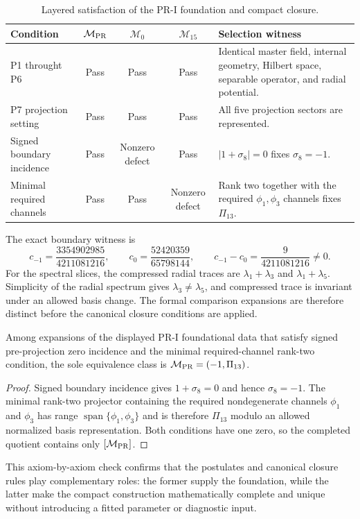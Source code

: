 \begin{table}[H]
\centering
\small
\caption{Layered satisfaction of the PR-I foundation and compact closure.}
\label{tab:axiom-satisfaction}
\begin{tabularx}{\textwidth}{@{}p{}c c c X@{}}
\toprule
Condition & $\mathcal M_{\rm PR}$ & $\mathcal M_0$ & $\mathcal M_{15}$ & Selection witness \\
\midrule
P1 throught P6 & Pass & Pass & Pass & Identical master field, internal geometry, Hilbert space, separable operator, and radial potential. \\
P7 projection setting & Pass & Pass & Pass & All five projection sectors are represented. \\
Signed boundary incidence & Pass & Nonzero defect & Pass & $|1+\sigma_8|=0$ fixes $\sigma_8=-1$. \\
Minimal required channels & Pass & Pass & Nonzero defect & Rank two together with the required $\phi_1,\phi_3$ channels fixes $\Pi_{13}$. \\
\bottomrule
\end{tabularx}
\end{table}

The exact boundary witness is
\begin{equation}
 c_{-1}=\frac{3354902985}{4211081216},\qquad
 c_0=\frac{52420359}{65798144},\qquad
 c_{-1}-c_0=\frac{9}{4211081216}\ne0.
\end{equation}
For the spectral slices, the compressed radial traces are $\lambda_1+\lambda_3$ and $\lambda_1+\lambda_5$.  Simplicity of the radial spectrum gives $\lambda_3\ne\lambda_5$, and compressed trace is invariant under an allowed basis change.  The formal comparison expansions are therefore distinct before the canonical closure conditions are applied.

\begin{theorem}
Among expansions of the displayed PR-I foundational data that satisfy signed pre-projection zero incidence and the minimal required-channel rank-two condition, the sole equivalence class is
$\mathcal M_{\rm PR}=(-1,\Pi_{13})$.
\end{theorem}
\begin{proof}
Signed boundary incidence gives $1+\sigma_8=0$ and hence $\sigma_8=-1$.  The minimal rank-two projector containing the required nondegenerate channels $\phi_1$ and $\phi_3$ has range $\operatorname{span}\{\phi_1,\phi_3\}$ and is therefore $\Pi_{13}$ modulo an allowed normalized basis representation.  Both conditions have one zero, so the completed quotient contains only $[\mathcal M_{\rm PR}]$.
\end{proof}

This axiom-by-axiom check confirms that the postulates and canonical closure rules play complementary roles: the former supply the foundation, while the latter make the compact construction mathematically complete and unique without introducing a fitted parameter or diagnostic input.
